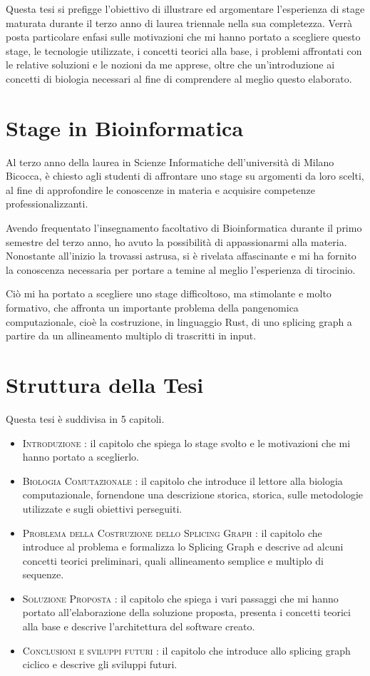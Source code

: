 Questa tesi si prefigge l'obiettivo di illustrare ed argomentare l'esperienza di stage maturata durante il terzo anno di laurea triennale nella sua completezza. Verrà posta particolare enfasi sulle motivazioni che mi hanno portato a scegliere questo stage, le tecnologie utilizzate, i concetti teorici alla base, i problemi affrontati con le relative soluzioni e le nozioni da me apprese, oltre che un'introduzione ai concetti di biologia necessari al fine di comprendere al meglio questo elaborato.

\section{Stage in Bioinformatica}
Al terzo anno della laurea in Scienze Informatiche dell'università di Milano Bicocca, è chiesto agli studenti di affrontare uno stage su argomenti da loro scelti, al fine di approfondire le conoscenze in materia e acquisire competenze professionalizzanti.

Avendo frequentato l'insegnamento facoltativo di Bioinformatica durante il primo semestre del terzo anno, ho avuto la possibilità di appassionarmi alla materia. Nonostante all'inizio la trovassi astrusa, si è rivelata affascinante e mi ha fornito la conoscenza necessaria per portare a temine al meglio l'esperienza di tirocinio.

Ciò mi ha portato a scegliere uno stage difficoltoso, ma stimolante e molto formativo, che affronta un importante problema della pangenomica computazionale, cioè la costruzione, in linguaggio Rust, di uno splicing graph a partire da un allineamento multiplo di trascritti in input.

\newpage

\section{Struttura della Tesi}
Questa tesi è suddivisa in 5 capitoli.

\begin{itemize}
    \item \textsc{Introduzione : } il capitolo che spiega lo stage svolto e le motivazioni che mi hanno portato a sceglierlo.
    \item \textsc{Biologia Comutazionale : } il capitolo che introduce il lettore alla biologia computazionale, fornendone una descrizione storica, storica, sulle metodologie utilizzate e sugli obiettivi perseguiti.
    \item \textsc{Problema della Costruzione dello Splicing Graph : } il capitolo che introduce al problema e formalizza lo Splicing Graph e descrive ad alcuni concetti teorici preliminari, quali allineamento semplice e multiplo di sequenze.
    \item \textsc{Soluzione Proposta : } il capitolo che spiega i vari passaggi che mi hanno portato all'elaborazione della soluzione proposta, presenta i concetti teorici alla base e descrive l'architettura del software creato.
    \item \textsc{Conclusioni e sviluppi futuri : } il capitolo che introduce allo splicing graph ciclico e descrive gli sviluppi futuri.
\end{itemize}